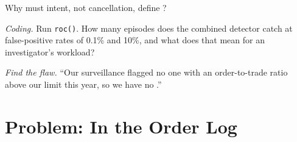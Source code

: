 \begin{exercise}[$\star\star$]\label{exo:s2:manipulative-strategies-and-how-they-are-caught:6}
Why must intent, not cancellation, define ?
\end{exercise}

\begin{exercise}[$\star\star\star$]\label{exo:s2:manipulative-strategies-and-how-they-are-caught:7}
\emph{Coding.} Run \texttt{roc()}. How many  episodes does the combined detector catch at false-positive rates of 0.1\% and 10\%, and what
does that mean for an investigator's workload?
\end{exercise}

\begin{exercise}[$\star\star\star$]\label{exo:s2:manipulative-strategies-and-how-they-are-caught:8}
\emph{Find the flaw.} ``Our surveillance flagged no one with an order-to-trade ratio above our limit this year, so we have no .''
\end{exercise}

\section{Problem: In the Order Log}

